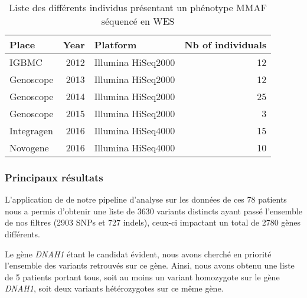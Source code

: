 \documentclass[12pt,a4paper,twoside]{ugathesis}
\begin{document}
\begin{longtable}[t]{lrlr}
\caption{\label{tab:tabrunbigmmaf}Liste des différents individus présentant un phénotype MMAF séquencé en WES}\\
\toprule
Place & Year & Platform & Nb of individuals\\
\midrule
IGBMC & 2012 & Illumina HiSeq2000 & 12\\
Genoscope & 2013 & Illumina HiSeq2000 & 12\\
Genoscope & 2014 & Illumina HiSeq2000 & 25\\
Genoscope & 2015 & Illumina HiSeq2000 & 3\\
Integragen & 2016 & Illumina HiSeq4000 & 15\\
Novogene & 2016 & Illumina HiSeq4000 & 10\\
\bottomrule
\end{longtable}



\newpage

\subsubsection{Principaux résultats}\label{principaux-resultats-4}

L'application de de notre pipeline d'analyse sur les données de ces 78
patients nous a permis d'obtenir une liste de 3630 variants distincts
ayant passé l'ensemble de nos filtres (2903 SNPs et 727 indels), ceux-ci
impactant un total de 2780 gènes différents.

Le gène \emph{DNAH1} étant le candidat évident, nous avons cherché en
priorité l'ensemble des variants retrouvés sur ce gène. Ainsi, nous
avons obtenu une liste de 5 patients portant tous, soit au moins un
variant homozygote sur le gène \emph{DNAH1}, soit deux variants
hétérozygotes sur ce même gène.
\end{document}
